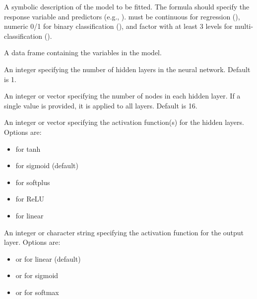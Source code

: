 \documentclass[a4paper]{book}
\begin{document}
\begin{Arguments}
\begin{ldescription}
\item[\code{formula}] A symbolic description of the model to be fitted. The formula should specify the response variable and predictors (e.g., ).  must be continuous for regression (), numeric 0/1 for binary classification (), and factor with at least 3 levels for multi-classification ().

\item[\code{data}] A data frame containing the variables in the model.

\item[\code{L}] An integer specifying the number of hidden layers in the neural network. Default is 1.

\item[\code{nodes}] An integer or vector specifying the number of nodes in each hidden layer. If a single value is provided, it is applied to all layers. Default is 16.

\item[\code{act\_fn}] An integer or vector specifying the activation function(s) for the hidden layers. Options are:
\begin{itemize}

\item{}  for tanh
\item{}  for sigmoid (default)
\item{}  for softplus
\item{}  for ReLU
\item{}  for linear

\end{itemize}


\item[\code{out\_act\_fn}] An integer or character string specifying the activation function for the output layer. Options are:
\begin{itemize}

\item{}  or  for linear (default)
\item{}  or  for sigmoid
\item{}  or  for softmax

\end{itemize}



\end{ldescription}
\end{Arguments}
\end{document}
